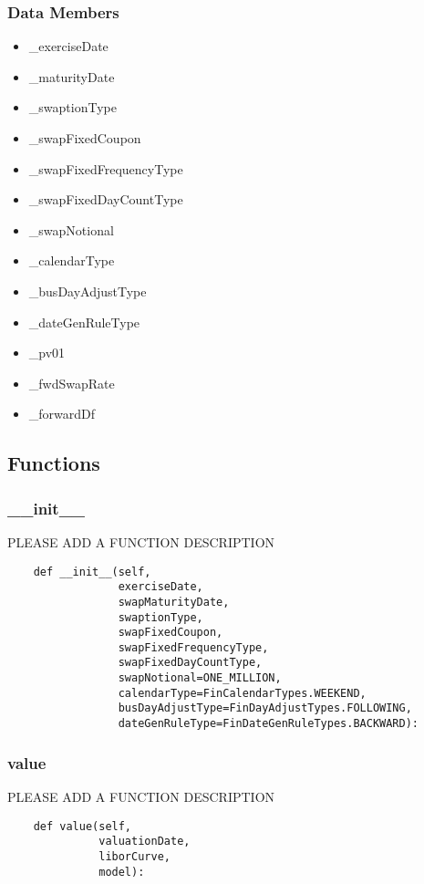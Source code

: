 \documentclass[twoside,11pt]{book}
\begin{document}
\subsubsection*{Data Members}
\begin{itemize}
\item{\_exerciseDate}
\item{\_maturityDate}
\item{\_swaptionType}
\item{\_swapFixedCoupon}
\item{\_swapFixedFrequencyType}
\item{\_swapFixedDayCountType}
\item{\_swapNotional}
\item{\_calendarType}
\item{\_busDayAdjustType}
\item{\_dateGenRuleType}
\item{\_pv01}
\item{\_fwdSwapRate}
\item{\_forwardDf}
\end{itemize}

\subsection*{Functions}

\subsubsection*{{\bf \_\_init\_\_}}
PLEASE ADD A FUNCTION DESCRIPTION

\begin{lstlisting}
    def __init__(self,
                 exerciseDate,
                 swapMaturityDate,
                 swaptionType,
                 swapFixedCoupon,
                 swapFixedFrequencyType,
                 swapFixedDayCountType,
                 swapNotional=ONE_MILLION,
                 calendarType=FinCalendarTypes.WEEKEND,
                 busDayAdjustType=FinDayAdjustTypes.FOLLOWING,
                 dateGenRuleType=FinDateGenRuleTypes.BACKWARD):
\end{lstlisting}

\subsubsection*{{\bf value}}
PLEASE ADD A FUNCTION DESCRIPTION

\begin{lstlisting}
    def value(self,
              valuationDate,
              liborCurve,
              model):
\end{lstlisting}
\end{document}
